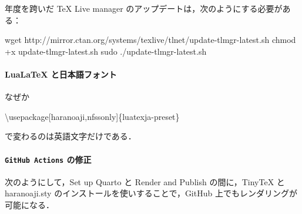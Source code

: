 \documentclass[
]{ltjsarticle}
\newenvironment{Shaded}{\begin{snugshade}}{\end{snugshade}}
\newcommand{\BuiltInTok}[1]{\textcolor[rgb]{0.00,0.23,0.31}{#1}}
\newcommand{\ExtensionTok}[1]{\textcolor[rgb]{0.00,0.23,0.31}{#1}}
\newcommand{\FunctionTok}[1]{\textcolor[rgb]{0.28,0.35,0.67}{#1}}
\newcommand{\NormalTok}[1]{\textcolor[rgb]{0.00,0.23,0.31}{#1}}
\begin{document}
\begin{tcolorbox}[enhanced jigsaw, colframe=quarto-callout-important-color-frame, opacityback=0, toprule=.15mm, colbacktitle=quarto-callout-important-color!10!white, breakable, title={注（TeX Live のアップデート方法）}, bottomrule=.15mm, leftrule=.75mm, opacitybacktitle=0.6, colback=white, arc=.35mm, coltitle=black, bottomtitle=1mm, toptitle=1mm, titlerule=0mm, rightrule=.15mm, left=2mm]

年度を跨いだ TeX Live manager
のアップデートは，次のようにする必要がある：

\begin{Shaded}
\begin{Highlighting}[]
\FunctionTok{wget}\NormalTok{ http://mirror.ctan.org/systems/texlive/tlnet/update{-}tlmgr{-}latest.sh}
\FunctionTok{chmod}\NormalTok{ +x update{-}tlmgr{-}latest.sh}
\FunctionTok{sudo}\NormalTok{ ./update{-}tlmgr{-}latest.sh}
\end{Highlighting}
\end{Shaded}

\end{tcolorbox}

\paragraph{LuaLaTeX
と日本語フォント}\label{lualatex-ux3068ux65e5ux672cux8a9eux30d5ux30a9ux30f3ux30c8}

なぜか

\begin{Shaded}
\begin{Highlighting}[]
\BuiltInTok{\textbackslash{}usepackage}\NormalTok{[haranoaji,nfssonly]\{}\ExtensionTok{luatexja{-}preset}\NormalTok{\}}
\end{Highlighting}
\end{Shaded}

で変わるのは英語文字だけである．

\paragraph{\texorpdfstring{\texttt{GitHub\ Actions}
の修正}{GitHub Actions の修正}}\label{github-actions-ux306eux4feeux6b63}

次のようにして，Set up Quarto と Render and Publish の間に，TinyTeX と
haranoaji.sty のインストールを使いすることで，GitHub
上でもレンダリングが可能になる．
\end{document}
